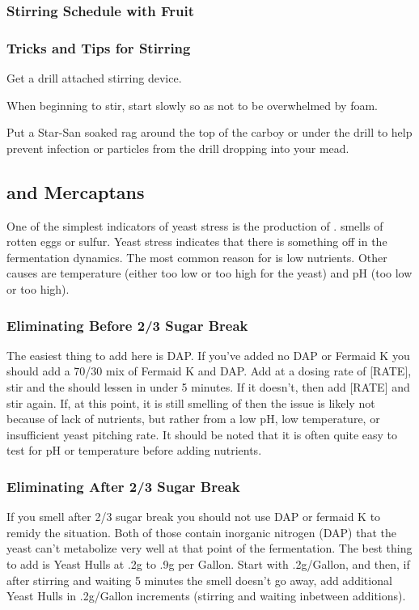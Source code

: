 \documentclass{article}
\begin{document}
  \subsubsection{Stirring Schedule with Fruit}

  \subsubsection{Tricks and Tips for Stirring}
   Get a drill attached stirring device.

   When beginning to stir, start slowly so as not to be overwhelmed by foam. 

   Put a Star-San soaked rag around the top of the carboy or under the drill to help prevent infection or particles from the drill dropping into your mead.

 \subsection{ and Mercaptans}
  One of the simplest indicators of yeast stress is the production of .  smells of rotten eggs or sulfur. Yeast stress indicates that there is
  something off in the fermentation dynamics. The most common reason for  is low nutrients. Other causes are temperature (either too low or too high for 
  the yeast) and pH (too low or too high).

  \subsubsection{Eliminating Before 2/3 Sugar Break}
   The easiest thing to add here is DAP. If you've added no DAP or Fermaid K you should add a 70/30 mix of Fermaid K and DAP. Add at a dosing rate of [RATE], stir and the 
    should lessen in under 5 minutes. If it doesn't, then add [RATE] and stir again. If, at this point, it is still smelling of  then the issue is likely
   not because of lack of nutrients, but rather from a low pH, low temperature, or insufficient yeast pitching rate. It should be noted that it is often quite easy 
   to test for pH or temperature before adding nutrients.

  \subsubsection{Eliminating After 2/3 Sugar Break} 
   If you smell  after 2/3 sugar break you should not use DAP or fermaid K to remidy the situation. Both of those contain inorganic nitrogen (DAP) 
   that the yeast can't metabolize very well at that point of the fermentation. The best thing to add is Yeast Hulls at .2g to .9g per Gallon. Start with .2g/Gallon, and
   then, if after stirring and waiting 5 minutes the  smell doesn't go away, add additional Yeast Hulls in .2g/Gallon increments (stirring and waiting inbetween
   additions).
\end{document}
